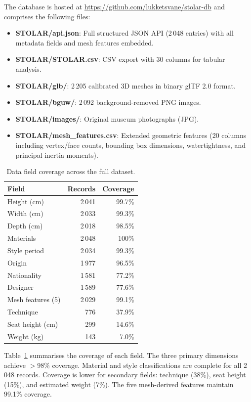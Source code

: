 The database is hosted at \url{https://github.com/lukketsvane/stolar-db}
and comprises the following files:

\begin{itemize}
\item \textbf{STOLAR/api.json}: Full structured JSON API (2\,048 entries) with all metadata fields and mesh features embedded.
\item \textbf{STOLAR/STOLAR.csv}: CSV export with 30 columns for tabular analysis.
\item \textbf{STOLAR/glb/}: 2\,205 calibrated 3D meshes in binary glTF 2.0 format.
\item \textbf{STOLAR/bguw/}: 2\,092 background-removed PNG images.
\item \textbf{STOLAR/images/}: Original museum photographs (JPG).
\item \textbf{STOLAR/mesh\_features.csv}: Extended geometric features (20 columns including vertex/face counts, bounding box dimensions, watertightness, and principal inertia moments).
\end{itemize}

\begin{table}[t]
\caption{Data field coverage across the full dataset.}
\label{tab:coverage}
\centering\small
\begin{tabular}{lrr}
\toprule
Field & Records & Coverage \\
\midrule
Height (cm)       & 2\,041 & 99.7\% \\
Width (cm)        & 2\,033 & 99.3\% \\
Depth (cm)        & 2\,018 & 98.5\% \\
Materials         & 2\,048 & 100\% \\
Style period      & 2\,034 & 99.3\% \\
Origin            & 1\,977 & 96.5\% \\
Nationality       & 1\,581 & 77.2\% \\
Designer          & 1\,589 & 77.6\% \\
Mesh features (5) & 2\,029 & 99.1\% \\
Technique         & 776    & 37.9\% \\
Seat height (cm)  & 299    & 14.6\% \\
Weight (kg)       & 143    & 7.0\% \\
\bottomrule
\end{tabular}
\end{table}

Table~\ref{tab:coverage} summarises the coverage of each field.
The three primary dimensions achieve $>$98\% coverage.
Material and style classifications are complete for all 2\,048 records.
Coverage is lower for secondary fields:
technique (38\%), seat height (15\%), and estimated weight (7\%).
The five mesh-derived features maintain 99.1\% coverage.

